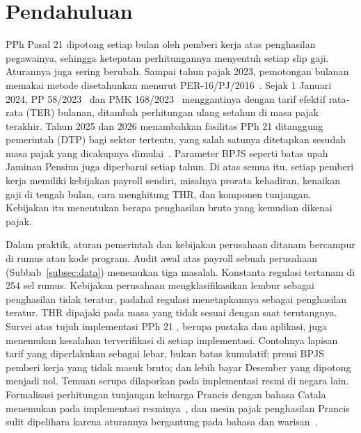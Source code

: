 \section{Pendahuluan}
\label{sec:pendahuluan}

PPh Pasal 21 dipotong setiap bulan oleh pemberi kerja atas penghasilan pegawainya, sehingga ketepatan perhitungannya menyentuh setiap slip gaji. Aturannya juga sering berubah. Sampai tahun pajak 2023, pemotongan bulanan memakai metode disetahunkan menurut PER-16/PJ/2016~\cite{per16_2016}. Sejak 1 Januari 2024, PP 58/2023~\cite{pp58_2023} dan PMK 168/2023~\cite{pmk168_2023} menggantinya dengan tarif efektif rata-rata (TER) bulanan, ditambah perhitungan ulang setahun di masa pajak terakhir. Tahun 2025 dan 2026 menambahkan fasilitas PPh 21 ditanggung pemerintah (DTP) bagi sektor tertentu, yang salah satunya ditetapkan sesudah masa pajak yang dicakupnya dimulai~\cite{pmk10_2025,pmk72_2025,pmk105_2025}. Parameter BPJS seperti batas upah Jaminan Pensiun juga diperbarui setiap tahun. Di atas semua itu, setiap pemberi kerja memiliki kebijakan payroll sendiri, misalnya prorata kehadiran, kenaikan gaji di tengah bulan, cara menghitung THR, dan komponen tunjangan. Kebijakan itu menentukan berapa penghasilan bruto yang kemudian dikenai pajak.

Dalam praktik, aturan pemerintah dan kebijakan perusahaan ditanam bercampur di rumus  atau kode program. Audit awal atas  payroll sebuah perusahaan (Subbab~\ref{subsec:data}) menemukan tiga masalah. Konstanta regulasi tertanam di 254 sel rumus. Kebijakan perusahaan mengklasifikasikan lembur sebagai penghasilan tidak teratur, padahal regulasi menetapkannya sebagai penghasilan teratur. THR dipajaki pada masa yang tidak sesuai dengan saat terutangnya. Survei atas tujuh implementasi PPh 21 , berupa pustaka dan aplikasi, juga menemukan kesalahan terverifikasi di setiap implementasi. Contohnya lapisan tarif yang diperlakukan sebagai lebar, bukan batas kumulatif; premi BPJS pemberi kerja yang tidak masuk bruto; dan lebih bayar Desember yang dipotong menjadi nol. Temuan serupa dilaporkan pada implementasi resmi di negara lain. Formalisasi perhitungan tunjangan keluarga Prancis dengan bahasa Catala menemukan  pada implementasi resminya~\cite{merigoux2021catala}, dan mesin pajak penghasilan Prancis sulit dipelihara karena aturannya bergantung pada bahasa dan  warisan~\cite{merigoux2021mlang}.

